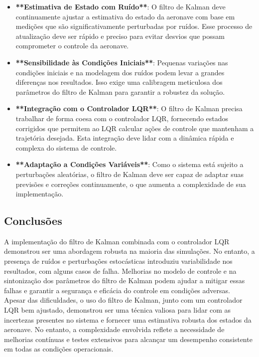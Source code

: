 \documentclass[a4paper, 12pt]{article}
\begin{document}
\begin{itemize}
    \item \textbf{**Estimativa de Estado com Ruído**}: O filtro de Kalman deve continuamente ajustar a estimativa do estado da aeronave com base em medições que são significativamente perturbadas por ruídos. Esse processo de atualização deve ser rápido e preciso para evitar desvios que possam comprometer o controle da aeronave.
    \item \textbf{**Sensibilidade às Condições Iniciais**}: Pequenas variações nas condições iniciais e na modelagem dos ruídos podem levar a grandes diferenças nos resultados. Isso exige uma calibragem meticulosa dos parâmetros do filtro de Kalman para garantir a robustez da solução.
    \item \textbf{**Integração com o Controlador LQR**}: O filtro de Kalman precisa trabalhar de forma coesa com o controlador LQR, fornecendo estados corrigidos que permitem ao LQR calcular ações de controle que mantenham a trajetória desejada. Esta integração deve lidar com a dinâmica rápida e complexa do sistema de controle.
    \item \textbf{**Adaptação a Condições Variáveis**}: Como o sistema está sujeito a perturbações aleatórias, o filtro de Kalman deve ser capaz de adaptar suas previsões e correções continuamente, o que aumenta a complexidade de sua implementação.
\end{itemize}

\subsection{Conclusões}

A implementação do filtro de Kalman combinada com o controlador LQR demonstrou ser uma abordagem robusta na maioria das simulações. No entanto, a presença de ruídos e perturbações estocásticas introduziu variabilidade nos resultados, com alguns casos de falha. Melhorias no modelo de controle e na sintonização dos parâmetros do filtro de Kalman podem ajudar a mitigar essas falhas e garantir a segurança e eficácia do controle em condições adversas.\\

Apesar das dificuldades, o uso do filtro de Kalman, junto com um controlador LQR bem ajustado, demonstrou ser uma técnica valiosa para lidar com as incertezas presentes no sistema e fornecer uma estimativa robusta dos estados da aeronave. No entanto, a complexidade envolvida reflete a necessidade de melhorias contínuas e testes extensivos para alcançar um desempenho consistente em todas as condições operacionais.






\newpage
\nocite{beer:ferdinand}
\nocite{janos:2005:algpseudocode}
\nocite{zandt:2010:fancyvrb}


























\end{document}
